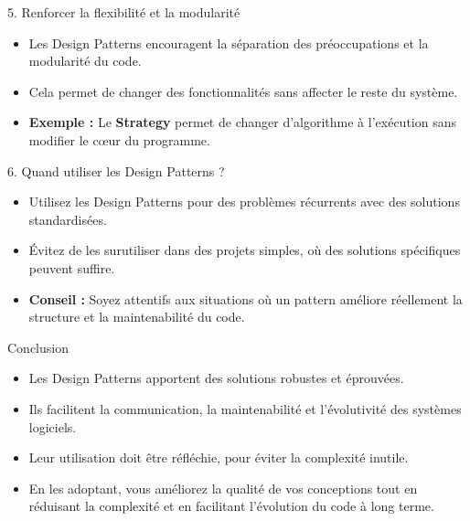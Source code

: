 \documentclass[aspectratio=169]{beamer}
\begin{document}
        \begin{frame}{5. Renforcer la flexibilité et la modularité}
            \begin{itemize}
                \item Les Design Patterns encouragent la séparation des préoccupations et la modularité du code.
                \item Cela permet de changer des fonctionnalités sans affecter le reste du système.
                \item \textbf{Exemple :} Le \textbf{Strategy} permet de changer d'algorithme à l'exécution sans modifier le cœur du programme.
            \end{itemize}
        \end{frame}

        \begin{frame}{6. Quand utiliser les Design Patterns ?}
            \begin{itemize}
                \item Utilisez les Design Patterns pour des problèmes récurrents avec des solutions standardisées.
                \item Évitez de les surutiliser dans des projets simples, où des solutions spécifiques peuvent suffire.
                \item \textbf{Conseil :} Soyez attentifs aux situations où un pattern améliore réellement la structure et la maintenabilité du code.
            \end{itemize}
        \end{frame}

        \begin{frame}{Conclusion}
        \begin{itemize}
            \item Les Design Patterns apportent des solutions robustes et éprouvées.
            \item Ils facilitent la communication, la maintenabilité et l'évolutivité des systèmes logiciels.
            \item Leur utilisation doit être réfléchie, pour éviter la complexité inutile.
            \item En les adoptant, vous améliorez la qualité de vos conceptions tout en réduisant la complexité et en facilitant l'évolution du code à long terme.
        \end{itemize}
        \end{frame}
\end{document}
